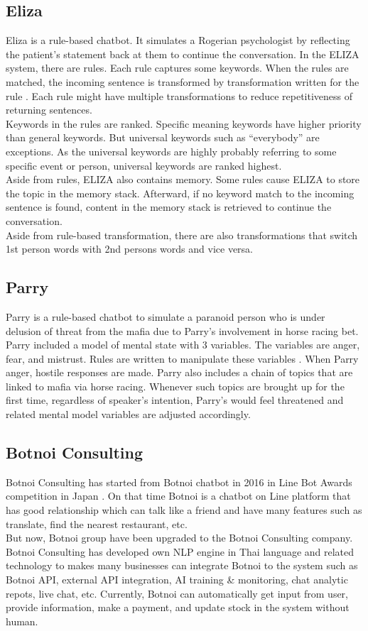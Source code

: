 \documentclass[12pt,oneside,openright,a4paper]{cpe-english-project}
\begin{document}
\subsection{Eliza}
Eliza is a rule-based chatbot. It simulates a Rogerian psychologist by reflecting the patient’s
statement back at them to continue the conversation. In the ELIZA system, there are rules. Each
rule captures some keywords. When the rules are matched, the incoming sentence is transformed
by transformation written for the rule \cite{what_is_eliza}. Each rule might have multiple
transformations to reduce repetitiveness of returning sentences.\\
Keywords in the rules are ranked. Specific meaning keywords have higher priority than general
keywords. But universal keywords such as “everybody” are exceptions. As the universal keywords
are highly probably referring to some specific event or person, universal keywords are ranked
highest.\\
Aside from rules, ELIZA also contains memory. Some rules cause ELIZA to store the topic in the
memory stack. Afterward, if no keyword match to the incoming sentence is found, content in the
memory stack is retrieved to continue the conversation.\\
Aside from rule-based transformation, there are also transformations that switch 1st person
words with 2nd persons words and vice versa.

\subsection{Parry}
Parry is a rule-based chatbot to simulate a paranoid person who is under delusion of threat
from the mafia due to Parry’s involvement in horse racing bet. Parry included a model of mental
state with 3 variables. The variables are anger, fear, and mistrust. Rules are written to
manipulate these variables \cite{parry_met_eliza}
. When Parry anger, hostile responses are made. Parry also includes a chain of topics that are
linked to mafia via horse racing. Whenever such topics are brought up for the first time,
regardless of speaker’s intention, Parry’s would feel threatened and related mental model
variables are adjusted accordingly.

\subsection{Botnoi Consulting}
Botnoi Consulting has started from Botnoi chatbot in 2016 in Line Bot Awards competition in Japan \cite{botnoi_enterprise_chatbot}.
On that time Botnoi is a chatbot on Line platform that has good relationship which can talk like
a friend and have many features such as translate, find the nearest restaurant, etc.\\
But now, Botnoi group have been upgraded to the Botnoi Consulting company. Botnoi Consulting
has developed own NLP engine in Thai language and related technology to makes many businesses
can integrate Botnoi to the system such as Botnoi API, external API integration, AI training
\& monitoring, chat analytic repots, live chat, etc. Currently, Botnoi can automatically get
input from user, provide information, make a payment, and update stock in the system without human.
\end{document}

